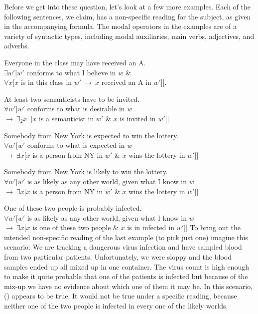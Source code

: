 Before we get into these question, let's look at a few more examples. Each of
the following sentences, we claim, has a non-specific reading for the subject,
as given in the accompanying formula. The modal operators in the examples are of
a variety of syntactic types, including modal auxiliaries, main verbs,
adjectives, and adverbs.

\ex\label{everymay}Everyone in the class may have received an A.\\
$\exists w'[w'$ conforms to what I believe in $w$ \&\\
\hfill$\forall x[x$ is in this class in $w'\ \rightarrow\ x$ received an A in
$w'$]].\xe

\ex At least two semanticists have to be invited.\\
$\forall w'[w'$ conforms to what is desirable in $w$\\
\hfill$ \rightarrow\ \exists_2 x$\ [$x$ is a semanticist in $w'$ \& $x$ is
invited in $w'$]].\xe

\ex\label{ny}Somebody from New York is expected to win the lottery.\\
$\forall w'[w'$ conforms to what is expected in $w$\\
\hfill$ \rightarrow\ \exists x[x$ is a person from NY in $w'$ \& $x$ wins the
lottery in $w'$]]\xe

\ex\label{nyli}Somebody from New York is likely to win the lottery.\\
$\forall w'[w'$ is as likely as any other world, given what I know in $w$\\
\hfill$ \rightarrow\ \exists x[x$ is a person from NY in $w'$ \& $x$ wins the
lottery in $w'$]]\xe

\ex One of these two people is probably infected.\\
$\forall w'[w'$ is as likely as any other world, given what I know in $w$\\
\hfill$ \rightarrow\ \exists x[x$ is one of these two people \& $x$ is in
infected in $w'$]]\xe
%
To bring out the intended non-specific reading of the last example (to pick just
one) imagine this scenario: We are tracking a dangerous virus infection and have
sampled blood from two particular patients. Unfortunately, we were sloppy and
the blood samples ended up all mixed up in one container. The virus count is
high enough to make it quite probable that one of the patients is infected but
because of the mix-up we have no evidence about which one of them it may be. In
this scenario, (\lastx) appears to be true. It would not be true under a
specific reading, because neither one of the two people is infected in every one
of the likely worlds.

